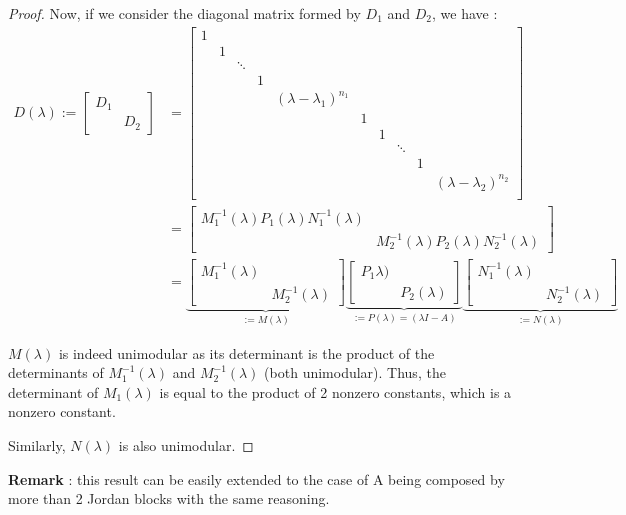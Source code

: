 \documentclass[11pt]{article}
\begin{document}
\begin{proof}
Now, if we consider the diagonal matrix formed by $D_1$ and $D_2$, we have :
\begin{align*}D(\lambda):=
\begin{bmatrix}
D_1 &\\
& D_2
\end{bmatrix} &= \begin{bmatrix}
1 & & & &&&&&\\
  &1& & &&&&&\\
  & &\ddots& &&&&&\\
  & & & 1& &&&&\\
  & & &  &(\lambda - \lambda_1)^{n_1}&&&&\\
  &&&&&1 & & & &\\
  &&&&&&1& & &\\
  &&&&&& &\ddots& &\\
  &&&&&& & & 1& \\
  &&&&&&& &  &(\lambda - \lambda_2)^{n_2}\\
\end{bmatrix}\\
&=\begin{bmatrix}
M_1^{-1}(\lambda)P_1(\lambda) N_1^{-1}(\lambda) &\\
& M_2^{-1}(\lambda)P_2(\lambda) N_2^{-1}(\lambda)
\end{bmatrix}\\
&=
\underbrace{\begin{bmatrix}
M_1^{-1}(\lambda) &\\
& M_2^{-1}(\lambda)
\end{bmatrix}}_{:=M(\lambda)}
\underbrace{\begin{bmatrix}
P_1\lambda) &\\
& P_2(\lambda)
\end{bmatrix}}_{:= P(\lambda) = (\lambda I - A)}
\underbrace{\begin{bmatrix}
N_1^{-1}(\lambda) &\\
& N_2^{-1}(\lambda)
\end{bmatrix}}_{:=N(\lambda)}
\end{align*}

$M(\lambda)$ is indeed unimodular as its determinant is the product of the determinants of $M_1^{-1}(\lambda)$ and $M_2^{-1}(\lambda)$ (both unimodular). Thus, the determinant of $M_1(\lambda)$ is equal to the product of 2 nonzero constants, which is a nonzero constant.

Similarly, $N(\lambda)$ is also unimodular.
\end{proof}
\textbf{Remark} : this result can be easily extended to the case of A being composed by more than 2 Jordan blocks with the same reasoning. 
\end{document}
